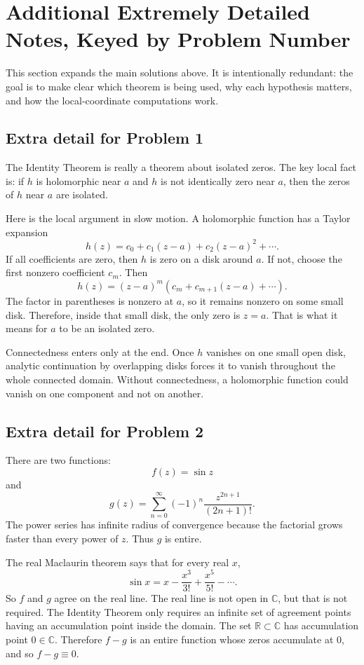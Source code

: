 \documentclass[11pt]{article}
\newcommand{\C}{\mathbb{C}}
\newcommand{\R}{\mathbb{R}}
\begin{document}
\section*{Additional Extremely Detailed Notes, Keyed by Problem Number}

This section expands the main solutions above. It is intentionally redundant: the goal is to make clear which theorem is being used, why each hypothesis matters, and how the local-coordinate computations work.

\subsection*{Extra detail for Problem 1}

The Identity Theorem is really a theorem about isolated zeros. The key local fact is:
if $h$ is holomorphic near $a$ and $h$ is not identically zero near $a$, then the zeros of $h$ near $a$ are isolated.

Here is the local argument in slow motion. A holomorphic function has a Taylor expansion
\[
 h(z)=c_0+c_1(z-a)+c_2(z-a)^2+\cdots.
\]
If all coefficients are zero, then $h$ is zero on a disk around $a$. If not, choose the first nonzero coefficient $c_m$. Then
\[
 h(z)=(z-a)^m(c_m+c_{m+1}(z-a)+\cdots).
\]
The factor in parentheses is nonzero at $a$, so it remains nonzero on some small disk. Therefore, inside that small disk, the only zero is $z=a$. That is what it means for $a$ to be an isolated zero.

Connectedness enters only at the end. Once $h$ vanishes on one small open disk, analytic continuation by overlapping disks forces it to vanish throughout the whole connected domain. Without connectedness, a holomorphic function could vanish on one component and not on another.

\subsection*{Extra detail for Problem 2}

There are two functions:
\[
 f(z)=\sin z
\]
and
\[
 g(z)=\sum_{n=0}^{\infty}(-1)^n\frac{z^{2n+1}}{(2n+1)!}.
\]
The power series has infinite radius of convergence because the factorial grows faster than every power of $z$. Thus $g$ is entire.

The real Maclaurin theorem says that for every real $x$,
\[
 \sin x=x-\frac{x^3}{3!}+\frac{x^5}{5!}-\cdots.
\]
So $f$ and $g$ agree on the real line. The real line is not open in $\C$, but that is not required. The Identity Theorem only requires an infinite set of agreement points having an accumulation point inside the domain. The set $\R\subset\C$ has accumulation point $0\in\C$. Therefore $f-g$ is an entire function whose zeros accumulate at $0$, and so $f-g\equiv0$.
\end{document}
